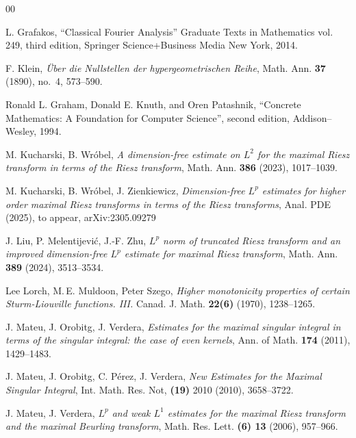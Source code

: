 \documentclass[a4paper,12pt,reqno]{amsart}
\numberwithin{equation}{section}
\theoremstyle{definition}
\begin{document}
%
%

\newcommand{\doi}[1]{\href{https://doi.org/#1}{\texttt{\scriptsize DOI:#1}}}

\begin{thebibliography}{00}

L. Grafakos,
``Classical Fourier Analysis''
Graduate Texts in Mathematics vol. 249, third edition,
Springer Science+Business Media New York, 2014.


F. Klein,
\emph{\"Uber die Nullstellen der hypergeometrischen Reihe},
Math. Ann. {\bf 37} (1890), no.~4, 573--590.



Ronald L. Graham, Donald E. Knuth, and Oren Patashnik,
``Concrete Mathematics: A Foundation for Computer Science'',
second edition, Addison--Wesley, 1994.



M. Kucharski, B. Wr\'obel,
\emph{A dimension-free estimate on $L^2$ for the maximal Riesz transform in terms of the Riesz transform},
Math. Ann. {\bf 386} (2023), 1017--1039.


M. Kucharski, B. Wr\'obel, J. Zienkiewicz,
\emph{Dimension-free $L^p$ estimates for higher order maximal Riesz transforms in terms of the Riesz transforms},
Anal. PDE (2025), to appear, arXiv:2305.09279


J. Liu, P. Melentijević, J.-F. Zhu,
\emph{$L^p$ norm of truncated Riesz transform and an improved dimension-free $L^p$ estimate for maximal Riesz transform},
Math. Ann. {\bf 389} (2024), 3513--3534.


Lee Lorch, M.\,E. Muldoon, Peter Szego,
\emph{Higher monotonicity properties of certain Sturm-Liouville functions. III.}
Canad. J. Math. {\bf 22(6)} (1970), 1238--1265.


J. Mateu, J. Orobitg,  J. Verdera,
\emph{Estimates for the maximal singular integral in terms of the singular integral: the case of even kernels},
Ann. of Math. {\bf 174} (2011), 1429--1483.

    
J. Mateu, J. Orobitg, C. P\'erez, J. Verdera,
\emph{New Estimates for the Maximal Singular Integral},
Int. Math. Res. Not, {\bf (19)} 2010 (2010), 3658--3722.
	

J. Mateu, J. Verdera,
\emph{$L^p$ and weak $L^1$ estimates for the maximal Riesz transform and the maximal Beurling transform},
Math. Res. Lett. {\bf (6) 13} (2006), 957--966.



\end{thebibliography}
\end{document}
